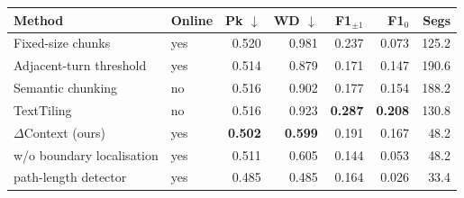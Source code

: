 \begin{tabular}{llrrrrr}
\toprule
Method & Online & Pk $\downarrow$ & WD $\downarrow$ & F1$_{\pm1}$ & F1$_{0}$ & Segs \\
\midrule
Fixed-size chunks & yes & 0.520 & 0.981 & 0.237 & 0.073 & 125.2 \\
Adjacent-turn threshold & yes & 0.514 & 0.879 & 0.171 & 0.147 & 190.6 \\
Semantic chunking & no & 0.516 & 0.902 & 0.177 & 0.154 & 188.2 \\
TextTiling & no & 0.516 & 0.923 & \textbf{0.287} & \textbf{0.208} & 130.8 \\
$\Delta$Context (ours) & yes & \textbf{0.502} & \textbf{0.599} & 0.191 & 0.167 & 48.2 \\
\midrule
\quad w/o boundary localisation & yes & 0.511 & 0.605 & 0.144 & 0.053 & 48.2 \\
\quad path-length detector & yes & 0.485 & 0.485 & 0.164 & 0.026 & 33.4 \\
\bottomrule
\end{tabular}
